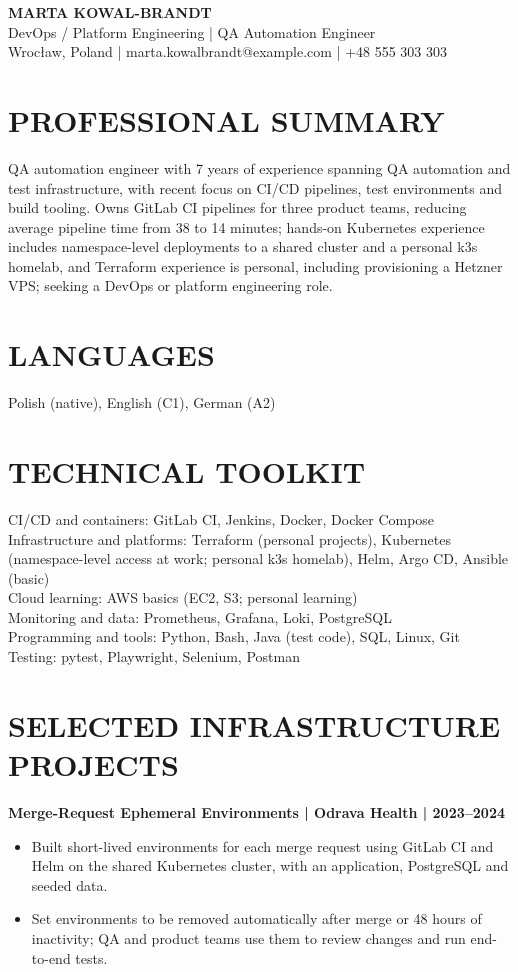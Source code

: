 \documentclass[11pt,a4paper]{article}
\begin{document}
\begin{center}
{\Huge\bfseries\color{primarycolor} MARTA KOWAL-BRANDT}\\
{\large\color{accentcolor} DevOps / Platform Engineering | QA Automation Engineer}\\[0.3em]
Wrocław, Poland | marta.kowalbrandt@example.com | +48 555 303 303
\end{center}

\section*{PROFESSIONAL SUMMARY}
QA automation engineer with 7 years of experience spanning QA automation and test infrastructure, with recent focus on CI/CD pipelines, test environments and build tooling. Owns GitLab CI pipelines for three product teams, reducing average pipeline time from 38 to 14 minutes; hands-on Kubernetes experience includes namespace-level deployments to a shared cluster and a personal k3s homelab, and Terraform experience is personal, including provisioning a Hetzner VPS; seeking a DevOps or platform engineering role.

\section*{LANGUAGES}
Polish (native), English (C1), German (A2)

\section*{TECHNICAL TOOLKIT}
CI/CD and containers: GitLab CI, Jenkins, Docker, Docker Compose\\
Infrastructure and platforms: Terraform (personal projects), Kubernetes (namespace-level access at work; personal k3s homelab), Helm, Argo CD, Ansible (basic)\\
Cloud learning: AWS basics (EC2, S3; personal learning)\\
Monitoring and data: Prometheus, Grafana, Loki, PostgreSQL\\
Programming and tools: Python, Bash, Java (test code), SQL, Linux, Git\\
Testing: pytest, Playwright, Selenium, Postman

\section*{SELECTED INFRASTRUCTURE PROJECTS}
\textbf{Merge-Request Ephemeral Environments | Odrava Health | 2023--2024}
\begin{itemize}
\item Built short-lived environments for each merge request using GitLab CI and Helm on the shared Kubernetes cluster, with an application, PostgreSQL and seeded data.
\item Set environments to be removed automatically after merge or 48 hours of inactivity; QA and product teams use them to review changes and run end-to-end tests.
\end{itemize}
\end{document}
